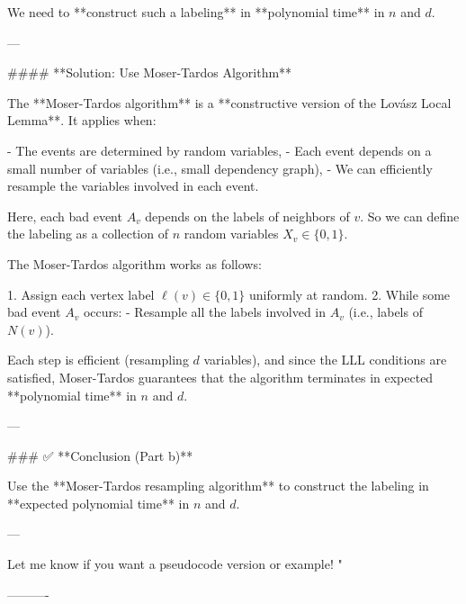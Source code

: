 \begin{enumerate}
\begin{shaded}
We need to **construct such a labeling** in **polynomial time** in \( n \) and \( d \).

---

#### **Solution: Use Moser-Tardos Algorithm**

The **Moser-Tardos algorithm** is a **constructive version of the Lovász Local Lemma**. It applies when:

- The events are determined by random variables,
- Each event depends on a small number of variables (i.e., small dependency graph),
- We can efficiently resample the variables involved in each event.

Here, each bad event \( A_v \) depends on the labels of neighbors of \( v \). So we can define the labeling as a collection of \( n \) random variables \( X_v \in \{0,1\} \).

The Moser-Tardos algorithm works as follows:

1. Assign each vertex label \( \ell(v) \in \{0,1\} \) uniformly at random.
2. While some bad event \( A_v \) occurs:
   - Resample all the labels involved in \( A_v \) (i.e., labels of \( N(v) \)).

Each step is efficient (resampling \( d \) variables), and since the LLL conditions are satisfied, Moser-Tardos guarantees that the algorithm terminates in expected **polynomial time** in \( n \) and \( d \).

---

### ✅ **Conclusion (Part b)**

Use the **Moser-Tardos resampling algorithm** to construct the labeling in **expected polynomial time** in \( n \) and \( d \).

---

Let me know if you want a pseudocode version or example!
"

\fi
\end{shaded}
\fi

\end{enumerate}


----------

